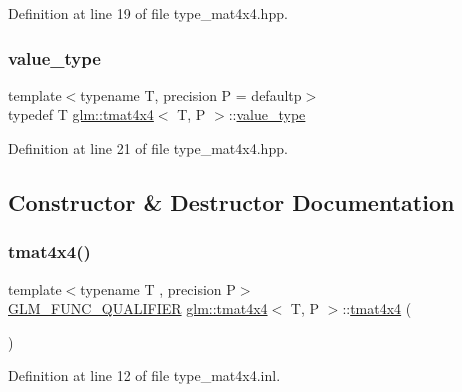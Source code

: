 Definition at line 19 of file type\+\_\+mat4x4.\+hpp.

\mbox{\label{structglm_1_1tmat4x4_a1317abc40eb95911feacd54ee09cabc5}} 
\subsubsection{\texorpdfstring{value\_type}{value\_type}}
{\footnotesize\ttfamily template$<$typename T, precision P = defaultp$>$ \\
typedef T \mbox{\hyperlink{structglm_1_1tmat4x4}{glm\+::tmat4x4}}$<$ T, P $>$\+::\mbox{\hyperlink{structglm_1_1tmat4x4_a1317abc40eb95911feacd54ee09cabc5}{value\+\_\+type}}}



Definition at line 21 of file type\+\_\+mat4x4.\+hpp.



\subsection{Constructor \& Destructor Documentation}
\mbox{\label{structglm_1_1tmat4x4_a498603057d9ae375f68da4d8db153c13}} 
\subsubsection{\texorpdfstring{tmat4x4()}{tmat4x4()}\hspace{0.1cm}{\footnotesize\ttfamily [1/22]}}
{\footnotesize\ttfamily template$<$typename T , precision P$>$ \\
\mbox{\hyperlink{setup_8hpp_a33fdea6f91c5f834105f7415e2a64407}{G\+L\+M\+\_\+\+F\+U\+N\+C\+\_\+\+Q\+U\+A\+L\+I\+F\+I\+ER}} \mbox{\hyperlink{structglm_1_1tmat4x4}{glm\+::tmat4x4}}$<$ T, P $>$\+::\mbox{\hyperlink{structglm_1_1tmat4x4}{tmat4x4}} (\begin{DoxyParamCaption}{ }\end{DoxyParamCaption})}



Definition at line 12 of file type\+\_\+mat4x4.\+inl.

\mbox{\label{structglm_1_1tmat4x4_ae62c8e2f96d55faadb111a8754fc23c8}} 

